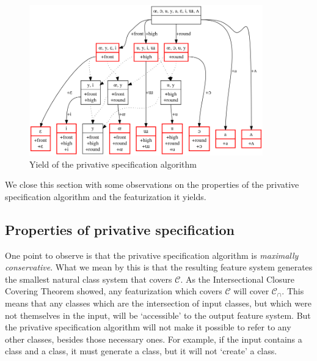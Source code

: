 \documentclass[11pt, oneside]{article}   	%
\begin{document}
\begin{figure}[h]
\includegraphics[width=0.9\textwidth]{vowelHarmony_privative.png}
\caption{Yield of the privative specification algorithm}
\label{fig:privative}
\end{figure}

We close this section with some observations on the properties of the privative specification algorithm and the featurization it yields. 

\subsection{Properties of privative specification}

One point to observe is that the privative specification algorithm is \textit{maximally conservative}. What we mean by this is that the resulting feature system generates the smallest natural class system that covers $\mathcal C$. As the Intersectional Closure Covering Theorem showed, any featurization which covers $\mathcal C$ will cover $\mathcal C_\cap$. This means that any classes which are the intersection of input classes, but which were not themselves in the input, will be `accessible' to the output feature system. But the privative specification algorithm will not make it possible to refer to any other classes, besides those necessary ones. For example, if the input contains a  class and a  class, it must generate a  class, but it will not `create' a  class.
\end{document}
